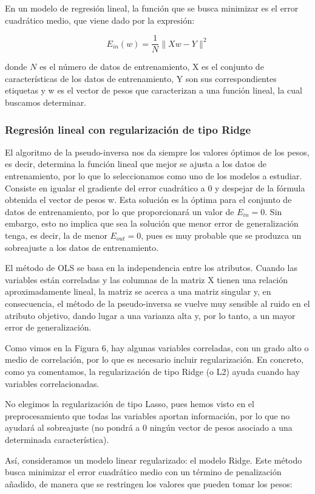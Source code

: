 \documentclass[a4]{article}
\begin{document}
En un modelo de regresión lineal, la función que se busca minimizar es el error cuadrático medio, que viene dado por la expresión:

$$ E_{in}(w)=\frac{1}{N}\|Xw-Y\|^2$$

donde $N$ es el número de datos de entrenamiento, X es el conjunto de características de los datos de entrenamiento, Y son sus correspondientes etiquetas y w es el vector de pesos que caracterizan a una función lineal, la cual buscamos determinar. 

\subsubsection{Regresión lineal con regularización de tipo Ridge}

El algoritmo de la pseudo-inversa nos da siempre los valores óptimos de los pesos, es decir, determina la función lineal que mejor se ajusta a los datos de entrenamiento, por lo que lo seleccionamos como uno de los modelos a estudiar. Consiste en igualar el gradiente del error cuadrático a 0 y despejar de la fórmula obtenida el vector de pesos w. Esta solución es la óptima para el conjunto de datos de entrenamiento, por lo que proporcionará un valor de $E_{in}=0$. Sin embargo, esto no implica que sea la solución que menor error de generalización tenga, es decir, la de menor $E_{out}=0$, pues es muy probable que se produzca un sobreajuste a los datos de entrenamiento. 

El método de OLS se basa en la independencia entre los atributos. Cuando las variables están correladas y las columnas de  la matriz X tienen una relación aproximadamente lineal, la matriz se acerca a una matriz singular y, en consecuencia, el método de la pseudo-inversa se vuelve muy sensible al ruido en el atributo objetivo, dando lugar a una varianza alta y, por lo tanto, a un mayor error de generalización. 

Como vimos en la Figura 6, hay algunas variables correladas, con un grado alto o medio de correlación, por lo que es necesario incluir regularización. En concreto, como ya comentamos, la regularización de tipo Ridge (o L2) ayuda cuando hay variables correlacionadas. 

No elegimos la regularización de tipo Lasso, pues hemos visto en el preprocesamiento que todas las variables aportan información, por lo que no ayudará al sobreajuste (no pondrá a 0 ningún vector de pesos asociado a una determinada característica).

Así, consideramos un modelo linear regularizado: el modelo Ridge. Este método busca minimizar el error cuadrático medio con un término de penalización añadido, de manera que se restringen los valores que pueden tomar los pesos:
\end{document}
